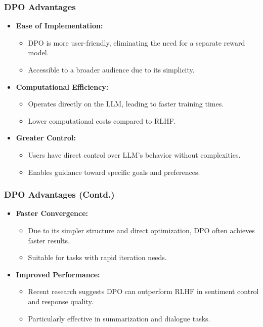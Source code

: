 \begin{frame}[fragile]\frametitle{DPO Advantages}
  \begin{itemize}
    \item \textbf{Ease of Implementation:}
      \begin{itemize}
        \item DPO is more user-friendly, eliminating the need for a separate reward model.
        \item Accessible to a broader audience due to its simplicity.
      \end{itemize}
    \item \textbf{Computational Efficiency:}
      \begin{itemize}
        \item Operates directly on the LLM, leading to faster training times.
        \item Lower computational costs compared to RLHF.
      \end{itemize}
    \item \textbf{Greater Control:}
      \begin{itemize}
        \item Users have direct control over LLM's behavior without complexities.
        \item Enables guidance toward specific goals and preferences.
      \end{itemize}
  \end{itemize}
\end{frame}

\begin{frame}[fragile]\frametitle{DPO Advantages (Contd.)}
  \begin{itemize}
    \item \textbf{Faster Convergence:}
      \begin{itemize}
        \item Due to its simpler structure and direct optimization, DPO often achieves faster results.
        \item Suitable for tasks with rapid iteration needs.
      \end{itemize}
    \item \textbf{Improved Performance:}
      \begin{itemize}
        \item Recent research suggests DPO can outperform RLHF in sentiment control and response quality.
        \item Particularly effective in summarization and dialogue tasks.
      \end{itemize}
  \end{itemize}
\end{frame}

